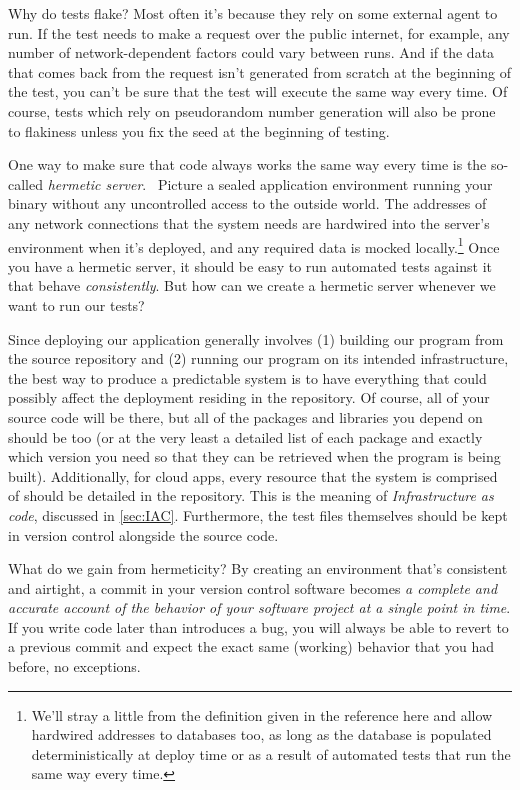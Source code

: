 \documentclass{article}
\newcommand{\noterm}[1]{\textit{#1}}
\newcommand{\term}[1]{\noterm{#1}\index{#1}}
\begin{document}
Why do tests flake?
Most often it's because they rely on some external agent to run.
If the test needs to make a request over the public internet, for example, any number of network-dependent factors could vary between runs.
And if the data that comes back from the request isn't generated from scratch at the beginning of the test, you can't be sure that the test will execute the same way every time.
Of course, tests which rely on pseudorandom number generation will also be prone to flakiness unless you fix the seed at the beginning of testing.

One way to make sure that code always works the same way every time is the so-called \term{hermetic server}.~\cite{google-hermetic-servers}
Picture a sealed application environment running your binary without any uncontrolled access to the outside world.
The addresses of any network connections that the system needs are hardwired into the server's environment when it's deployed, and any required data is mocked locally.\footnote{
  We'll stray a little from the definition given in the reference here and allow hardwired addresses to databases too, as long as the database is populated deterministically at deploy time or as a result of automated tests that run the same way every time.
}
Once you have a hermetic server, it should be easy to run automated tests against it that behave \term{consistently}.
But how can we create a hermetic server whenever we want to run our tests?

Since deploying our application generally involves (1) building our program from the source repository and (2) running our program on its intended infrastructure, the best way to produce a predictable system is to have everything that could possibly affect the deployment residing in the repository.
Of course, all of your source code will be there, but all of the packages and libraries you depend on should be too (or at the very least a detailed list of each package and exactly which version you need so that they can be retrieved when the program is being built).
Additionally, for cloud apps, every resource that the system is comprised of should be detailed in the repository.
This is the meaning of \term{Infrastructure as code}, discussed in \ref{sec:IAC}.
Furthermore, the test files themselves should be kept in version control alongside the source code.

What do we gain from hermeticity?
By creating an environment that's consistent and airtight, a commit in your version control software becomes \textit{a complete and accurate account of the behavior of your software project at a single point in time}.
If you write code later than introduces a bug, you will always be able to revert to a previous commit and expect the exact same (working) behavior that you had before, no exceptions.
\end{document}
